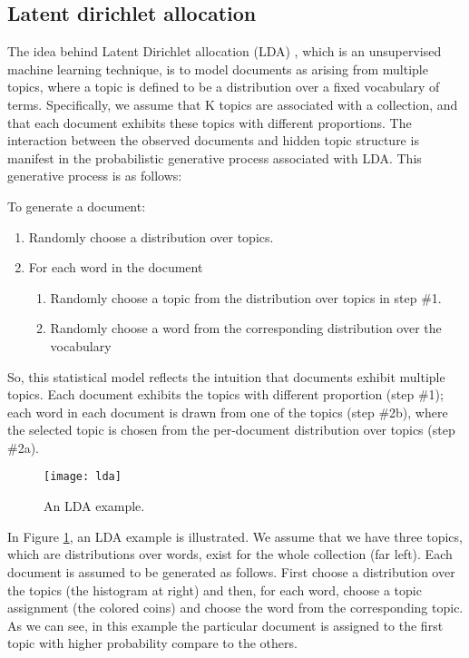 \subsection{Latent dirichlet allocation}


The idea behind Latent Dirichlet allocation (LDA) \cite{Blei, heinrich2005parameter, steyvers}, which is an unsupervised machine learning technique, is to model documents as arising from multiple topics, where a topic
is defined to be a distribution over a fixed vocabulary of terms. Specifically, we assume that K topics are
associated with a collection, and that each document exhibits these topics with different proportions. 
The interaction between the observed documents and hidden topic structure is manifest in the probabilistic generative process associated with LDA. This generative process is as follows:

To generate a document:
\begin{enumerate}
\item Randomly choose a distribution over topics.
\item For each word in the document
\begin{enumerate}
\item Randomly choose a topic from the distribution over topics in step \#1.
\item Randomly choose a word from the corresponding distribution over the vocabulary
\end{enumerate}
\end{enumerate}

So, this statistical model reflects the intuition that documents exhibit multiple topics. 
Each document exhibits the topics with different proportion (step \#1); each word in each document is drawn from one of the topics (step \#2b), where the selected topic is chosen 
from the per-document distribution over topics (step \#2a).

\begin{figure}
  \texttt{[image: lda]}
  \caption{An LDA example.}
  \label{fig:lda}
\end{figure}

In Figure \ref{fig:lda}, an LDA example is illustrated. We assume that we have three topics, which are distributions over words, exist for the whole collection (far left). Each document is assumed to be generated as follows. First choose a distribution over the topics (the histogram at right) and then, for each word, choose a topic assignment (the colored coins) and choose the 
word from the corresponding topic. As we can see, in this example the particular document is assigned to the first topic with higher probability compare to the others.

